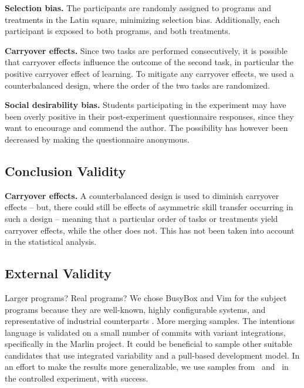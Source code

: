 \textbf{Selection bias.} The participants are randomly assigned to programs and treatments in the Latin square, minimizing selection bias. Additionally, each participant is exposed to both programs, and both treatments.

\textbf{Carryover effects.} Since two tasks are performed consecutively, it is possible that carryover effects influence the outcome of the second task, in particular the positive carryover effect of learning. To mitigate any carryover effects, we used a counterbalanced design, where the order of the two tasks are randomized.

\textbf{Social desirability bias.} Students participating in the experiment may have been overly positive in their post-experiment questionnaire responses, since they want to encourage and commend the author. The possibility has however been decreased by making the questionnaire anonymous.


\subsection{Conclusion Validity}

\textbf{Carryover effects.} A counterbalanced design is used to diminish carryover effects -- but, there could still be effects of asymmetric skill transfer occurring in such a design -- meaning that a particular order of tasks or treatments yield carryover effects, while the other does not. This has not been taken into account in the statistical analysis.

\subsection{External Validity}
Larger programs?
Real programs?
We chose BusyBox and Vim for the subject programs because they are well-known, highly configurable systems, and representative of industrial counterparts \cite{hunsen2016}.
More merging samples. The intentions language is validated on a small number of commits with variant integrations, specifically in the Marlin project. It could be beneficial to sample other suitable candidates that use integrated variability and a pull-based development model. In an effort to make the results more generalizable, we use samples from \vim~and \busybox~in the controlled experiment, with success.
